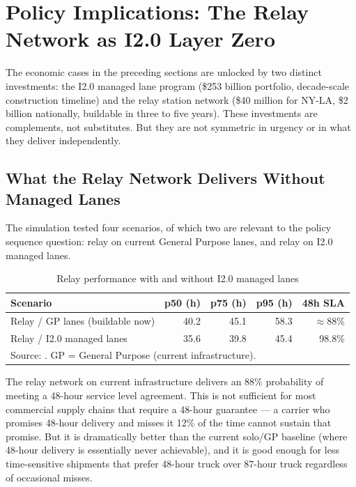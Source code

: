 \section{Policy Implications: The Relay Network as I2.0 Layer Zero}
\label{sec:policy}

The economic cases in the preceding sections are unlocked by two distinct investments:
the I2.0 managed lane program (\$253 billion portfolio, decade-scale construction timeline)
and the relay station network (\$40 million for NY-LA, \$2 billion nationally, buildable
in three to five years). These investments are complements, not substitutes. But they are
not symmetric in urgency or in what they deliver independently.

\subsection{What the Relay Network Delivers Without Managed Lanes}

The simulation tested four scenarios, of which two are relevant to the policy sequence
question: relay on current General Purpose lanes, and relay on I2.0 managed lanes.

\begin{table}[h]
\centering
\caption{Relay performance with and without I2.0 managed lanes}
\label{tab:relay_scenarios}
\begin{tabular}{lrrrr}
\toprule
Scenario & p50 (h) & p75 (h) & p95 (h) & 48h SLA \\
\midrule
Relay / GP lanes (buildable now)   & 40.2 & 45.1 & 58.3 & $\approx$88\% \\
Relay / I2.0 managed lanes         & 35.6 & 39.8 & 45.4 & 98.8\% \\
\bottomrule
\multicolumn{5}{l}{\footnotesize Source: \citet{ROUTE_C1}. GP = General Purpose (current infrastructure).} \\
\end{tabular}
\end{table}

The relay network on current infrastructure delivers an 88\% probability of meeting
a 48-hour service level agreement. This is not sufficient for most commercial supply chains
that require a 48-hour guarantee --- a carrier who promises 48-hour delivery and misses
it 12\% of the time cannot sustain that promise. But it is dramatically better than the
current solo/GP baseline (where 48-hour delivery is essentially never achievable), and
it is good enough for less time-sensitive shipments that prefer 48-hour truck over 87-hour
truck regardless of occasional misses.

